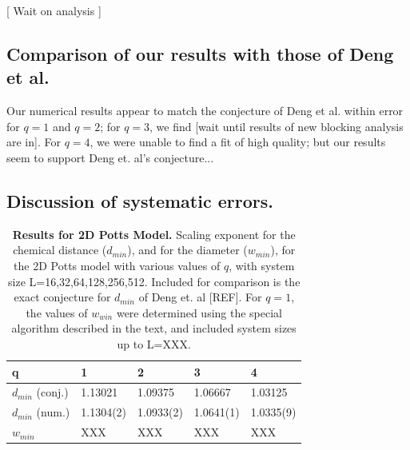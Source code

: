 \documentclass[pre,preprint,11pt]{revtex4}
\begin{document}
[ Wait on analysis ]

\subsection{ Comparison of our results with those of Deng et al.} 

Our numerical results appear to match the conjecture of Deng et al. \cite{Deng2010} within error for $q=1$ and $q=2$; for $q=3$, we find [wait until results of new blocking analysis are in].  For $q=4$, we were unable to find a fit of high quality; but our results seem to support Deng et. al's conjecture...

\subsection{ Discussion of systematic errors.}









\begin{table}[h]
\begin{center}
\begin{tabular}{| l | l | l | l | l |}
\hline
q & 1 & 2 & 3 & 4 \\
\hline
$d_{min}$ (conj.) & 1.13021 & 1.09375 & 1.06667 & 1.03125 \\
\hline
$d_{min}$ (num.) & 1.1304(2) & 1.0933(2) & 1.0641(1) & 1.0335(9) \\
\hline
$w_{min}$ & XXX & XXX & XXX & XXX \\

\hline
\end{tabular}
\caption{\label{tab:dminD2d} {\bf Results for 2D Potts Model.} Scaling exponent for the chemical distance ($d_{min}$), and for the diameter ($w_{min}$), for the 2D Potts model with various values of $q$, with system size L=16,32,64,128,256,512.  Included for comparison is the exact conjecture for $d_{min}$ of Deng et. al [REF]. For $q=1$, the values of $w_{win}$ were determined using the special algorithm described in the text, and included system sizes up to L=XXX.}

\end{center}
\end{table}
\end{document}
